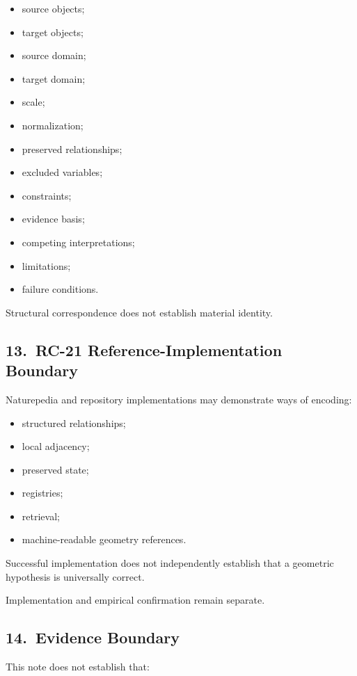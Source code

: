 \begin{itemize}
    \item source objects;
    \item target objects;
    \item source domain;
    \item target domain;
    \item scale;
    \item normalization;
    \item preserved relationships;
    \item excluded variables;
    \item constraints;
    \item evidence basis;
    \item competing interpretations;
    \item limitations;
    \item failure conditions.
\end{itemize}

Structural correspondence does not establish material identity.

\subsection*{13.\ RC-21 Reference-Implementation Boundary}

Naturepedia\texttrademark{} and repository implementations may demonstrate
ways of encoding:

\begin{itemize}
    \item structured relationships;
    \item local adjacency;
    \item preserved state;
    \item registries;
    \item retrieval;
    \item machine-readable geometry references.
\end{itemize}

Successful implementation does not independently establish that a geometric
hypothesis is universally correct.

Implementation and empirical confirmation remain separate.

\subsection*{14.\ Evidence Boundary}

This note does not establish that:

